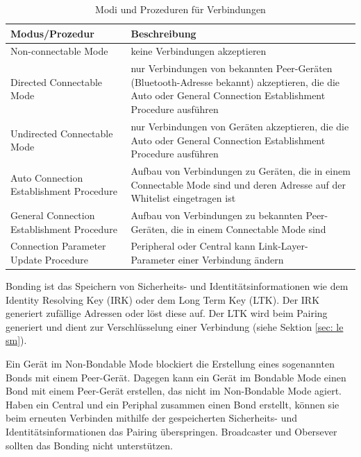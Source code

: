 \begin{table}
    \begin{tabularx}{\textwidth}{|p{4.5cm}|X|}
    \hline
    \textbf{Modus/Prozedur} & \textbf{Beschreibung} \\
    \hline
    Non-connectable Mode & keine Verbindungen akzeptieren \\
    \hline
    Directed Connectable Mode & nur Verbindungen von bekannten Peer-Geräten (Bluetooth-Adresse bekannt) akzeptieren, die die Auto oder General Connection Establishment Procedure ausführen \\
    \hline
    Undirected Connectable Mode & nur Verbindungen von Geräten akzeptieren, die die Auto oder General Connection Establishment Procedure ausführen \\
    \hline
    Auto Connection Establishment Procedure & Aufbau von Verbindungen zu Geräten, die in einem Connectable Mode sind und deren Adresse auf der Whitelist eingetragen ist \\
    \hline
    General Connection Establishment Procedure & Aufbau von Verbindungen zu bekannten Peer-Geräten, die in einem Connectable Mode sind \\
    \hline
    Connection Parameter Update Procedure & Peripheral oder Central kann Link-Layer-Parameter einer Verbindung ändern \\
    \hline
    \end{tabularx}
    \caption[Modi und Prozeduren für Verbindungen (GAP)]{Modi und Prozeduren für Verbindungen \cite{BtSpec4.0_1704-1718}}
    \label{tab: modi prodzeduren gap}
\end{table}

Bonding ist das Speichern von Sicherheits- und Identitätsinformationen wie dem Identity Resolving Key (IRK) oder dem Long Term Key (LTK). Der IRK generiert zufällige Adressen oder löst diese auf. Der LTK wird beim Pairing generiert und dient zur Verschlüsselung einer Verbindung (siehe Sektion \ref{sec: le sm}).

Ein Gerät im Non-Bondable Mode blockiert die Erstellung eines sogenannten Bonds mit einem Peer-Gerät. Dagegen kann ein Gerät im Bondable Mode einen Bond mit einem Peer-Gerät erstellen, das nicht im Non-Bondable Mode agiert. Haben ein Central und ein Periphal zusammen einen Bond erstellt, können sie beim erneuten Verbinden mithilfe der gespeicherten Sicherheits- und Identitätsinformationen das Pairing überspringen. Broadcaster und Obersever sollten das Bonding nicht unterstützen. \cite{BtSpec4.2_2060-2062}

